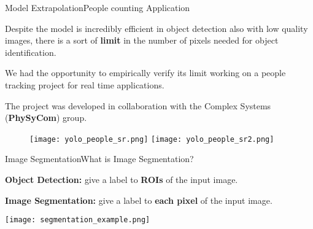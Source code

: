 \documentclass[10pt, technote, oribibl, unicode]{beamer}
\begin{document}
\begin{frame}{Model Extrapolation}{People counting Application}

  \scriptsize{Despite the model is incredibly efficient in object detection also with low quality images, there is a sort of \textbf{limit} in the number of pixels needed for object identification.}

  \scriptsize{We had the opportunity to empirically verify its limit working on a people tracking project for real time applications.}

  \scriptsize{The project was developed in collaboration with the Complex Systems (\textbf{PhySyCom}) group.}

  \begin{figure}
    \begin{overprint}
      \centering\texttt{[image: yolo\_people\_sr.png]}
      \centering\texttt{[image: yolo\_people\_sr2.png]}
    \end{overprint}
  \end{figure}

\end{frame}



\begin{frame}{Image Segmentation}{What is Image Segmentation?}

  \scriptsize{\textbf{Object Detection:} give a label to \textbf{ROIs} of the input image.}

  \scriptsize{\textbf{Image Segmentation:} give a label to \textbf{each pixel} of the input image.}

  \vfill

  \centering\texttt{[image: segmentation\_example.png]}

\end{frame}
\end{document}
